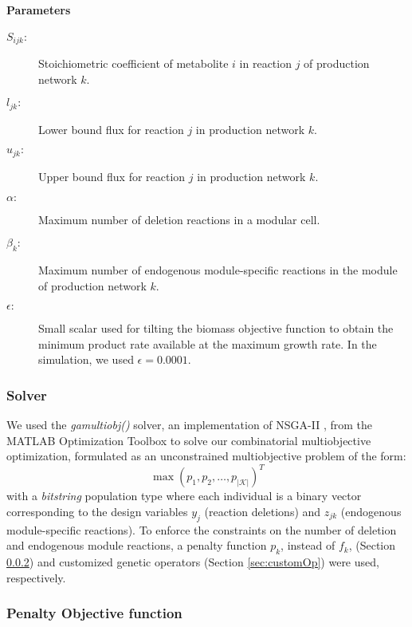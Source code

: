 \paragraph{Parameters}
\begin{description}
\item[$S_{ijk}:$] Stoichiometric coefficient of metabolite $i$ in reaction $j$ of production network $k$.
\item[$l_{jk}:$] Lower bound flux for reaction $j$ in production network $k$.
\item[$u_{jk}:$] Upper bound flux for reaction $j$ in production network $k$.
\item[$\alpha:$] Maximum number of deletion reactions in a modular cell.
\item[$\beta_k:$] Maximum number of endogenous module-specific reactions in the module of production network $k$.
\item[$\epsilon:$] Small scalar used for tilting the biomass objective function to obtain the minimum product rate available at the maximum growth rate. In the simulation, we used $\epsilon=0.0001$.
\end{description}

\subsubsection{Solver} \label{sec:mainMOP}
We used the \textit{gamultiobj()} solver, an implementation of NSGA-II \citep{deb2002}, from the MATLAB Optimization Toolbox to solve our combinatorial multiobjective optimization, formulated as an unconstrained multiobjective problem of
the form:
\begin{equation}
\max (p_1,p_2,\dots ,p_{|\mathcal{K}|})^T
\end{equation}
with a \textit{bitstring} population type where each individual is a binary vector corresponding to the design variables $y_j$ (reaction deletions) and $z_{jk}$ (endogenous module-specific reactions). To enforce the constraints on the number of deletion and endogenous module reactions, a penalty function $p_k$, instead of $f_k$, (Section \ref{sec:penalty}) and customized genetic operators (Section \ref{sec:customOp}) were used, respectively. %

\subsubsection{Penalty Objective function} \label{sec:penalty}

